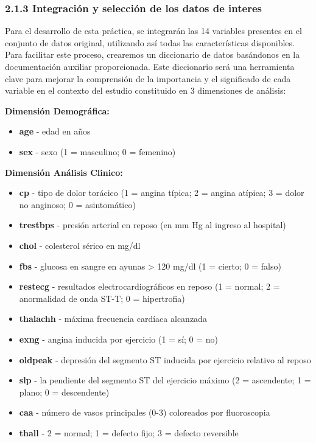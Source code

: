 \documentclass[
]{article}
\providecommand{\tightlist}{%
  \setlength{\itemsep}{0pt}\setlength{\parskip}{0pt}}
\begin{document}
\hypertarget{integraciuxf3n-y-selecciuxf3n-de-los-datos-de-interes}{%
\subsubsection{2.1.3 Integración y selección de los datos de
interes}\label{integraciuxf3n-y-selecciuxf3n-de-los-datos-de-interes}}

Para el desarrollo de esta práctica, se integrarán las 14 variables
presentes en el conjunto de datos original, utilizando así todas las
características disponibles. Para facilitar este proceso, crearemos un
diccionario de datos basándonos en la documentación auxiliar
proporcionada. Este diccionario será una herramienta clave para mejorar
la comprensión de la importancia y el significado de cada variable en el
contexto del estudio constituido en 3 dimensiones de análisis:

\textbf{Dimensión Demográfica:}

\begin{itemize}
\tightlist
\item
  \textbf{age} - edad en años
\item
  \textbf{sex} - sexo (1 = masculino; 0 = femenino)
\end{itemize}

\textbf{Dimensión Análisis Clinico:}

\begin{itemize}
\tightlist
\item
  \textbf{cp} - tipo de dolor torácico (1 = angina típica; 2 = angina
  atípica; 3 = dolor no anginoso; 0 = asintomático)
\item
  \textbf{trestbps} - presión arterial en reposo (en mm Hg al ingreso al
  hospital)
\item
  \textbf{chol} - colesterol sérico en mg/dl
\item
  \textbf{fbs} - glucosa en sangre en ayunas \textgreater{} 120 mg/dl (1
  = cierto; 0 = falso)
\item
  \textbf{restecg} - resultados electrocardiográficos en reposo (1 =
  normal; 2 = anormalidad de onda ST-T; 0 = hipertrofia)
\item
  \textbf{thalachh} - máxima frecuencia cardíaca alcanzada
\item
  \textbf{exng} - angina inducida por ejercicio (1 = sí; 0 = no)
\item
  \textbf{oldpeak} - depresión del segmento ST inducida por ejercicio
  relativo al reposo
\item
  \textbf{slp} - la pendiente del segmento ST del ejercicio máximo (2 =
  ascendente; 1 = plano; 0 = descendente)
\item
  \textbf{caa} - número de vasos principales (0-3) coloreados por
  fluoroscopia
\item
  \textbf{thall} - 2 = normal; 1 = defecto fijo; 3 = defecto reversible
\end{itemize}
\end{document}
